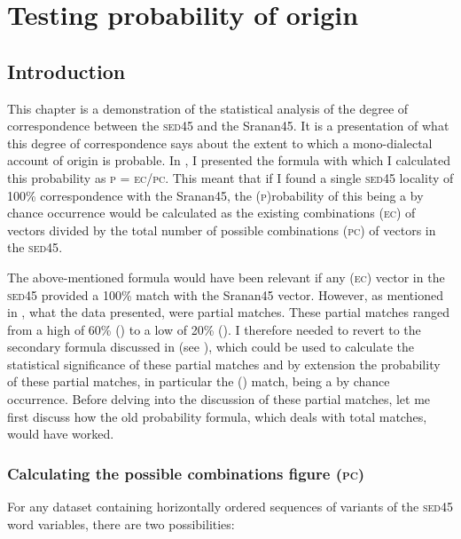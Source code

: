 \chapter{Testing probability of origin}\label{ch:4}

\section{Introduction} \label{4.1}
This chapter is a demonstration of the statistical analysis of the degree of correspondence between the \textsc{sed45} and the Sranan45. It is a presentation of what this degree of correspondence says about the extent to which a mono-dialectal account of origin is probable. In , I presented the formula with which I calculated this probability as \textsc{p} = \textsc{ec}\slash\textsc{pc}. This meant that if I found a single \textsc{sed45} locality of 100\% correspondence with the Sranan45, the (\textsc{p})robability of this being a by chance occurrence would be calculated as the existing combinations (\textsc{ec}) of vectors divided by the total number of possible combinations (\textsc{pc}) of vectors in the \textsc{sed45}.

The above-mentioned formula would have been relevant if any (\textsc{ec}) vector in the \textsc{sed45} provided a 100\% match with the Sranan45 vector. However, as mentioned in , what the data presented, were partial matches. These partial matches ranged from a high of 60\% () to a low of 20\% (). I therefore needed to revert to the secondary formula discussed in  (see ), which could be used to calculate the statistical significance of these partial matches and by extension the probability of these partial matches, in particular the () match, being a by chance occurrence. Before delving into the discussion of these partial matches, let me first discuss how the old probability formula, which deals with total matches, would have worked.

\subsection{Calculating the possible combinations figure (\textsc{pc})} \label{4.1.1}
For any dataset containing horizontally ordered sequences of variants of the \textsc{sed45} word variables, there are two possibilities:

